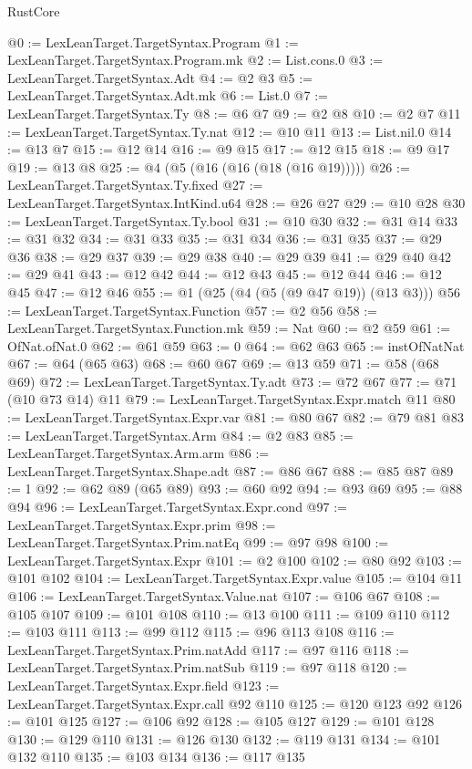 \begin{lexlean}{RustCore}
\begin{coremodule}
@0 := LexLeanTarget.TargetSyntax.Program
@1 := LexLeanTarget.TargetSyntax.Program.mk
@2 := List.cons.{0}
@3 := LexLeanTarget.TargetSyntax.Adt
@4 := @2 @3
@5 := LexLeanTarget.TargetSyntax.Adt.mk
@6 := List.{0}
@7 := LexLeanTarget.TargetSyntax.Ty
@8 := @6 @7
@9 := @2 @8
@10 := @2 @7
@11 := LexLeanTarget.TargetSyntax.Ty.nat
@12 := @10 @11
@13 := List.nil.{0}
@14 := @13 @7
@15 := @12 @14
@16 := @9 @15
@17 := @12 @15
@18 := @9 @17
@19 := @13 @8
@25 := @4 (@5 (@16 (@16 (@18 (@16 @19)))))
@26 := LexLeanTarget.TargetSyntax.Ty.fixed
@27 := LexLeanTarget.TargetSyntax.IntKind.u64
@28 := @26 @27
@29 := @10 @28
@30 := LexLeanTarget.TargetSyntax.Ty.bool
@31 := @10 @30
@32 := @31 @14
@33 := @31 @32
@34 := @31 @33
@35 := @31 @34
@36 := @31 @35
@37 := @29 @36
@38 := @29 @37
@39 := @29 @38
@40 := @29 @39
@41 := @29 @40
@42 := @29 @41
@43 := @12 @42
@44 := @12 @43
@45 := @12 @44
@46 := @12 @45
@47 := @12 @46
@55 := @1 (@25 (@4 (@5 (@9 @47 @19)) (@13 @3)))
@56 := LexLeanTarget.TargetSyntax.Function
@57 := @2 @56
@58 := LexLeanTarget.TargetSyntax.Function.mk
@59 := Nat
@60 := @2 @59
@61 := OfNat.ofNat.{0}
@62 := @61 @59
@63 := 0
@64 := @62 @63
@65 := instOfNatNat
@67 := @64 (@65 @63)
@68 := @60 @67
@69 := @13 @59
@71 := @58 (@68 @69)
@72 := LexLeanTarget.TargetSyntax.Ty.adt
@73 := @72 @67
@77 := @71 (@10 @73 @14) @11
@79 := LexLeanTarget.TargetSyntax.Expr.match @11
@80 := LexLeanTarget.TargetSyntax.Expr.var
@81 := @80 @67
@82 := @79 @81
@83 := LexLeanTarget.TargetSyntax.Arm
@84 := @2 @83
@85 := LexLeanTarget.TargetSyntax.Arm.arm
@86 := LexLeanTarget.TargetSyntax.Shape.adt
@87 := @86 @67
@88 := @85 @87
@89 := 1
@92 := @62 @89 (@65 @89)
@93 := @60 @92
@94 := @93 @69
@95 := @88 @94
@96 := LexLeanTarget.TargetSyntax.Expr.cond
@97 := LexLeanTarget.TargetSyntax.Expr.prim
@98 := LexLeanTarget.TargetSyntax.Prim.natEq
@99 := @97 @98
@100 := LexLeanTarget.TargetSyntax.Expr
@101 := @2 @100
@102 := @80 @92
@103 := @101 @102
@104 := LexLeanTarget.TargetSyntax.Expr.value
@105 := @104 @11
@106 := LexLeanTarget.TargetSyntax.Value.nat
@107 := @106 @67
@108 := @105 @107
@109 := @101 @108
@110 := @13 @100
@111 := @109 @110
@112 := @103 @111
@113 := @99 @112
@115 := @96 @113 @108
@116 := LexLeanTarget.TargetSyntax.Prim.natAdd
@117 := @97 @116
@118 := LexLeanTarget.TargetSyntax.Prim.natSub
@119 := @97 @118
@120 := LexLeanTarget.TargetSyntax.Expr.field
@123 := LexLeanTarget.TargetSyntax.Expr.call @92 @110
@125 := @120 @123 @92
@126 := @101 @125
@127 := @106 @92
@128 := @105 @127
@129 := @101 @128
@130 := @129 @110
@131 := @126 @130
@132 := @119 @131
@134 := @101 @132 @110
@135 := @103 @134
@136 := @117 @135

\end{coremodule}
\end{lexlean}
